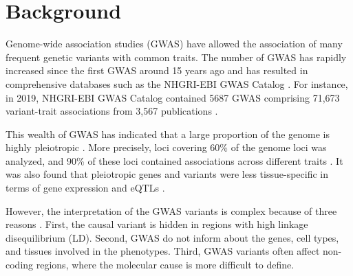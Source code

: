 \section*{Background}\label{sec:introduction}

%
%


Genome-wide association studies (GWAS) have allowed the association of many frequent genetic variants with common traits.
%
The number of GWAS has rapidly increased since the first GWAS around 15 years ago and has resulted in comprehensive databases such as the NHGRI-EBI GWAS Catalog \cite{2007burton.barret,2018.Parkinson.Buniello}.
%
For instance, in 2019, NHGRI-EBI GWAS Catalog contained 5687 GWAS comprising 71,673 variant-trait associations from 3,567 publications \cite{2018.Parkinson.Buniello}.


This wealth of GWAS has indicated that a large proportion of the genome is highly pleiotropic \cite{2019.Posthuma.Watanabe}.
%
More precisely, loci covering 60\% of the genome loci was analyzed, and 90\% of these loci contained associations across different traits \cite{2019.Posthuma.Watanabe}.
%
It was also found that pleiotropic genes and variants were less tissue-specific in terms of gene expression and eQTLs \cite{2019.Posthuma.Watanabe}.
%


However, the interpretation of the GWAS variants is complex because of three reasons \cite{2020.Trynka.CanoGamez}.
%
First, the causal variant is hidden in regions with high linkage disequilibrium (LD).
%
Second, GWAS do not inform about the genes, cell types, and tissues involved in the phenotypes.
%
Third, GWAS variants often affect non-coding regions, where the molecular cause is more difficult to define.


